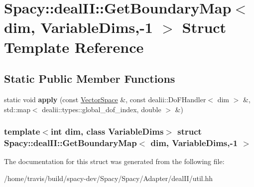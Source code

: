 \hypertarget{structSpacy_1_1dealII_1_1GetBoundaryMap_3_01dim_00_01VariableDims_00-1_01_4}{\section{\-Spacy\-:\-:deal\-I\-I\-:\-:\-Get\-Boundary\-Map$<$ dim, \-Variable\-Dims,-\/1 $>$ \-Struct \-Template \-Reference}
\label{structSpacy_1_1dealII_1_1GetBoundaryMap_3_01dim_00_01VariableDims_00-1_01_4}
}
\subsection*{\-Static \-Public \-Member \-Functions}
\begin{DoxyCompactItemize}
\item 
\hypertarget{structSpacy_1_1dealII_1_1GetBoundaryMap_3_01dim_00_01VariableDims_00-1_01_4_a446e81cfd556dbf1a7621774783e8364}{static void {\bfseries apply} (const \hyperlink{classSpacy_1_1VectorSpace}{\-Vector\-Space} \&, const dealii\-::\-Do\-F\-Handler$<$ dim $>$ \&, std\-::map$<$ dealii\-::types\-::global\-\_\-dof\-\_\-index, double $>$ \&)}\label{structSpacy_1_1dealII_1_1GetBoundaryMap_3_01dim_00_01VariableDims_00-1_01_4_a446e81cfd556dbf1a7621774783e8364}

\end{DoxyCompactItemize}
\subsubsection*{template$<$int dim, class Variable\-Dims$>$ struct Spacy\-::deal\-I\-I\-::\-Get\-Boundary\-Map$<$ dim, Variable\-Dims,-\/1 $>$}



\-The documentation for this struct was generated from the following file\-:\begin{DoxyCompactItemize}
\item 
/home/travis/build/spacy-\/dev/\-Spacy/\-Spacy/\-Adapter/deal\-I\-I/util.\-hh\end{DoxyCompactItemize}
